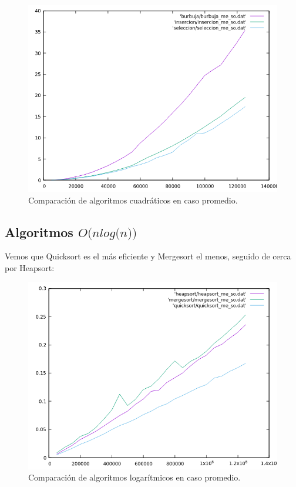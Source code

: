 \documentclass[a4paper,12pt,twoside]{article} %
\begin{document}
\begin{figure}[h]
  \begin{center}
  
  	\includegraphics[scale=0.8]{comparacion_cuadraticos.png}
  	\caption{Comparación de algoritmos cuadráticos en caso promedio.}
  	
  \end{center}
\end{figure}


\newpage
	
	\subsection{Algoritmos $\textit{O(nlog(n))}$}
	
	Vemos que Quicksort es el más eficiente y Mergesort el menos, seguido de cerca por Heapsort:
	
\begin{figure}[h]
  \begin{center}
  
  	\includegraphics[scale=0.8]{comparacion_logaritmicos.png}
  	\caption{Comparación de algoritmos logarítmicos en caso promedio.}
  	
  \end{center}
\end{figure}
\end{document}
